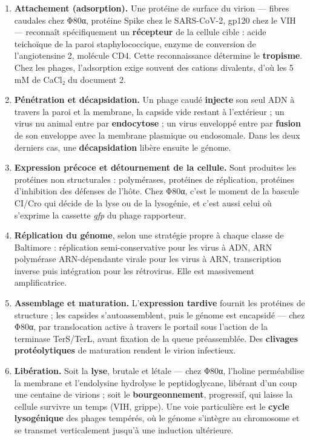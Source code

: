\documentclass[11pt,a4paper]{article}
\providecommand{\tightlist}{\setlength{\itemsep}{0pt}\setlength{\parskip}{0pt}}
\begin{document}
\begin{enumerate}
\def\labelenumi{\arabic{enumi}.}
\tightlist
\item
  \textbf{Attachement (adsorption).} Une protéine de surface du virion --- fibres caudales chez Φ80α, protéine Spike chez le SARS-CoV-2, gp120 chez le VIH --- reconnaît spécifiquement un \textbf{récepteur} de la cellule cible : acide teichoïque de la paroi staphylococcique, enzyme de conversion de l'angiotensine 2, molécule CD4. Cette reconnaissance détermine le \textbf{tropisme}. Chez les phages, l'adsorption exige souvent des cations divalents, d'où les 5 mM de CaCl₂ du document 2.
\item
  \textbf{Pénétration et décapsidation.} Un phage caudé \textbf{injecte} son seul ADN à travers la paroi et la membrane, la capside vide restant à l'extérieur ; un virus nu animal entre par \textbf{endocytose} ; un virus enveloppé entre par \textbf{fusion} de son enveloppe avec la membrane plasmique ou endosomale. Dans les deux derniers cas, une \textbf{décapsidation} libère ensuite le génome.
\item
  \textbf{Expression précoce et détournement de la cellule.} Sont produites les protéines non structurales : polymérases, protéines de réplication, protéines d'inhibition des défenses de l'hôte. Chez Φ80α, c'est le moment de la bascule CI/Cro qui décide de la lyse ou de la lysogénie, et c'est aussi celui où s'exprime la cassette \emph{gfp} du phage rapporteur.
\item
  \textbf{Réplication du génome}, selon une stratégie propre à chaque classe de Baltimore : réplication semi-conservative pour les virus à ADN, ARN polymérase ARN-dépendante virale pour les virus à ARN, transcription inverse puis intégration pour les rétrovirus. Elle est massivement amplificatrice.
\item
  \textbf{Assemblage et maturation.} L'\textbf{expression tardive} fournit les protéines de structure ; les capsides s'autoassemblent, puis le génome est encapsidé --- chez Φ80α, par translocation active à travers le portail sous l'action de la terminase TerS/TerL, avant fixation de la queue préassemblée. Des \textbf{clivages protéolytiques} de maturation rendent le virion infectieux.
\item
  \textbf{Libération.} Soit la \textbf{lyse}, brutale et létale --- chez Φ80α, l'holine perméabilise la membrane et l'endolysine hydrolyse le peptidoglycane, libérant d'un coup une centaine de virions ; soit le \textbf{bourgeonnement}, progressif, qui laisse la cellule survivre un temps (VIH, grippe). Une voie particulière est le \textbf{cycle lysogénique} des phages tempérés, où le génome s'intègre au chromosome et se transmet verticalement jusqu'à une induction ultérieure.
\end{enumerate}
\end{document}
